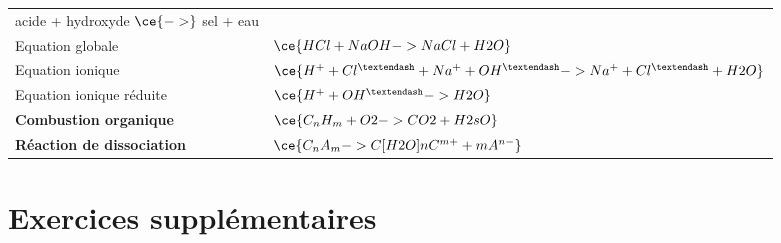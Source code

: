 \documentclass[
  11pt,
  french,
  a4paper,
  openany]{book}
\begin{document}
\begin{longtable}[]{@{}ll@{}}
\begin{minipage}[t]{0.65\columnwidth}
acide + hydroxyde \(\ce{->}\) sel + eau\strut
\end{minipage}\tabularnewline
\begin{minipage}[t]{0.29\columnwidth}\raggedright
Equation globale\strut
\end{minipage} & \begin{minipage}[t]{0.65\columnwidth}\raggedright
\(\ce{HCl + NaOH -> NaCl + H2O}\)\strut
\end{minipage}\tabularnewline
\begin{minipage}[t]{0.29\columnwidth}\raggedright
Equation ionique\strut
\end{minipage} & \begin{minipage}[t]{0.65\columnwidth}\raggedright
\(\ce{H^{+} + Cl^{–} + Na^{+} + OH^{–} -> Na^{+} + Cl^{–} + H2O}\)\strut
\end{minipage}\tabularnewline
\begin{minipage}[t]{0.29\columnwidth}\raggedright
Equation ionique réduite\strut
\end{minipage} & \begin{minipage}[t]{0.65\columnwidth}\raggedright
\(\ce{H^{+} + OH^{–} -> H2O}\)\strut
\end{minipage}\tabularnewline
\begin{minipage}[t]{0.29\columnwidth}\raggedright
\textbf{Combustion organique}\strut
\end{minipage} & \begin{minipage}[t]{0.65\columnwidth}\raggedright
\(\ce{C_{n}H_{m} + O2 -> CO2 + H2sO}\)\strut
\end{minipage}\tabularnewline
\begin{minipage}[t]{0.29\columnwidth}\raggedright
\textbf{Réaction de dissociation}\strut
\end{minipage} & \begin{minipage}[t]{0.65\columnwidth}\raggedright
\(\ce{C_{n}A_{m} ->C[H2O] n C^{m+} + m A^{n-}}\)\strut
\end{minipage}\tabularnewline
\bottomrule
\end{longtable}

\newpage

\hypertarget{exercices-suppluxe9mentaires-9}{%
\section{Exercices supplémentaires}\label{exercices-suppluxe9mentaires-9}}
\end{document}
